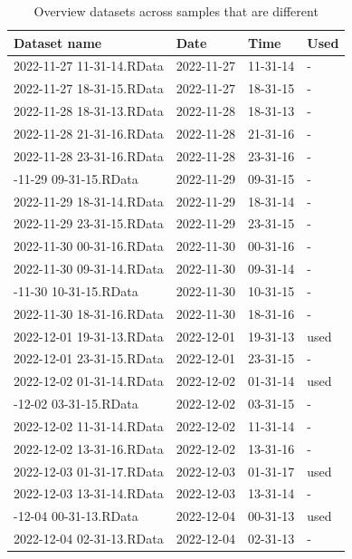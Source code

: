 \documentclass[
  letterpaper,
  DIV=11,
  numbers=noendperiod]{scrartcl}
\begin{document}
\hypertarget{tbl-A1}{}
\begin{table}
\caption{\label{tbl-A1}Overview datasets across samples that are different }\tabularnewline

\centering\begingroup\fontsize{6}{8}\selectfont

\begin{tabular}{llll}
\toprule
Dataset name & Date & Time & Used\\
\midrule
2022-11-27 11-31-14.RData & 2022-11-27 & 11-31-14 & -\\
2022-11-27 18-31-15.RData & 2022-11-27 & 18-31-15 & -\\
2022-11-28 18-31-13.RData & 2022-11-28 & 18-31-13 & -\\
2022-11-28 21-31-16.RData & 2022-11-28 & 21-31-16 & -\\
2022-11-28 23-31-16.RData & 2022-11-28 & 23-31-16 & -\\
\addlinespace
2022-11-29 09-31-15.RData & 2022-11-29 & 09-31-15 & -\\
2022-11-29 18-31-14.RData & 2022-11-29 & 18-31-14 & -\\
2022-11-29 23-31-15.RData & 2022-11-29 & 23-31-15 & -\\
2022-11-30 00-31-16.RData & 2022-11-30 & 00-31-16 & -\\
2022-11-30 09-31-14.RData & 2022-11-30 & 09-31-14 & -\\
\addlinespace
2022-11-30 10-31-15.RData & 2022-11-30 & 10-31-15 & -\\
2022-11-30 18-31-16.RData & 2022-11-30 & 18-31-16 & -\\
2022-12-01 19-31-13.RData & 2022-12-01 & 19-31-13 & used\\
2022-12-01 23-31-15.RData & 2022-12-01 & 23-31-15 & -\\
2022-12-02 01-31-14.RData & 2022-12-02 & 01-31-14 & used\\
\addlinespace
2022-12-02 03-31-15.RData & 2022-12-02 & 03-31-15 & -\\
2022-12-02 11-31-14.RData & 2022-12-02 & 11-31-14 & -\\
2022-12-02 13-31-16.RData & 2022-12-02 & 13-31-16 & -\\
2022-12-03 01-31-17.RData & 2022-12-03 & 01-31-17 & used\\
2022-12-03 13-31-14.RData & 2022-12-03 & 13-31-14 & -\\
\addlinespace
2022-12-04 00-31-13.RData & 2022-12-04 & 00-31-13 & used\\
2022-12-04 02-31-13.RData & 2022-12-04 & 02-31-13 & -\\

\end{tabular}
\end{table}
\end{document}
